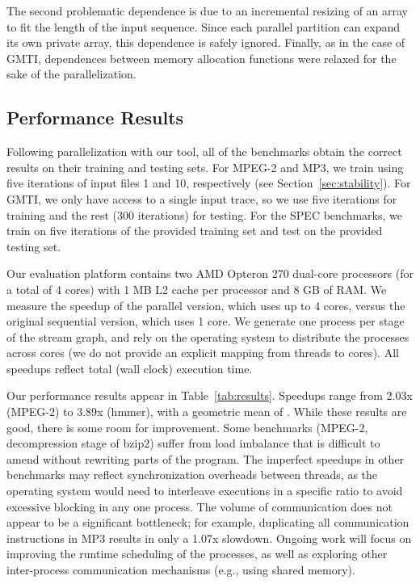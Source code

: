 The second problematic dependence is due to an incremental resizing of
an array to fit the length of the input sequence.  Since each parallel
partition can expand its own private array, this dependence is safely
ignored.  Finally, as in the case of GMTI, dependences between memory
allocation functions were relaxed for the sake of the parallelization.

\subsection*{Performance Results}
\label{sec:performance}

Following parallelization with our tool, all of the benchmarks obtain
the correct results on their training and testing sets.  For MPEG-2
and MP3, we train using five iterations of input files 1 and 10,
respectively (see Section~\ref{sec:stability}).  For GMTI, we only
have access to a single input trace, so we use five iterations for
training and the rest (300 iterations) for testing.  For the SPEC
benchmarks, we train on five iterations of the provided training set
and test on the provided testing set.

Our evaluation platform contains two AMD Opteron 270 dual-core
processors (for a total of 4 cores) with 1 MB L2 cache per processor
and 8 GB of RAM.  We measure the speedup of the parallel version,
which uses up to 4 cores, versus the original sequential version,
which uses 1 core.  We generate one process per stage of the stream
graph, and rely on the operating system to distribute the processes
across cores (we do not provide an explicit mapping from threads to
cores).  All speedups reflect total (wall clock) execution time.

Our performance results appear in Table~\ref{tab:results}.  Speedups
range from 2.03x (MPEG-2) to 3.89x (hmmer), with a geometric mean of
{\meanspeedup}.  While these results are good, there is some room for
improvement.  Some benchmarks (MPEG-2, decompression stage of bzip2)
suffer from load imbalance that is difficult to amend without
rewriting parts of the program.  The imperfect speedups in other
benchmarks may reflect synchronization overheads between threads, as
the operating system would need to interleave executions in a specific
ratio to avoid excessive blocking in any one process.  The volume of
communication does not appear to be a significant bottleneck; for
example, duplicating all communication instructions in MP3 results in
only a 1.07x slowdown.  Ongoing work will focus on improving the
runtime scheduling of the processes, as well as exploring other
inter-process communication mechanisms (e.g., using shared memory).

